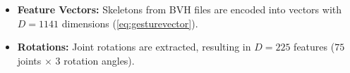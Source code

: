 \begin{itemize}
	\item \textbf{Feature Vectors:} Skeletons from BVH files are encoded into vectors with $D = 1141$ dimensions (\autoref{eq:gesturevector}).
	\item \textbf{Rotations:} Joint rotations are extracted, resulting in $D = 225$ features ($75$ joints $\times$ $3$ rotation angles).
\end{itemize}

%
%
%
%










